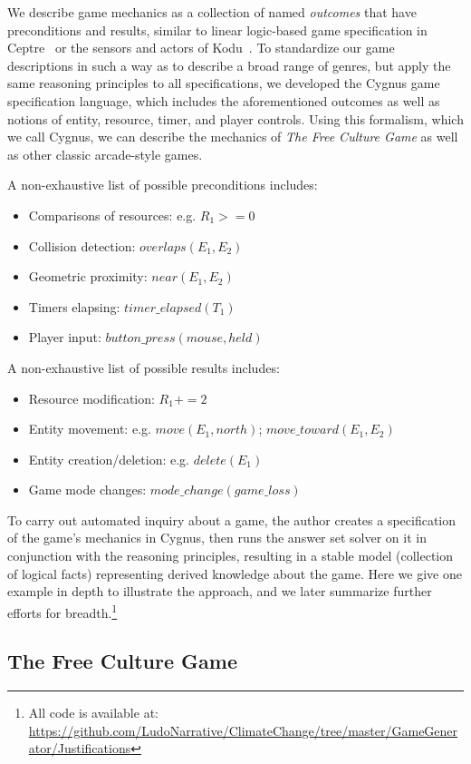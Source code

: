 \documentclass[a4paper]{article}
\begin{document}
We describe game mechanics as a collection of named {\em outcomes} that
have preconditions and results, similar to linear logic-based game
specification in Ceptre~\cite{martens2015ceptre} or the sensors and actors
of Kodu~\cite{stolee2011expressing}. To standardize our game descriptions
in such a way as to describe a broad range of genres, but apply the same
reasoning principles to all specifications, we developed the Cygnus game specification language, which includes the 
aforementioned outcomes as well as notions of
entity, resource, timer, and player controls. Using this formalism, which
we call Cygnus, we can describe the mechanics of {\em The Free Culture
Game} as well as other classic arcade-style games.

A non-exhaustive list of possible preconditions includes:
\begin{itemize}
\item Comparisons of resources: e.g. $R_1 >= 0$
\item Collision detection:  $overlaps(E_1, E_2)$
\item Geometric proximity: $near(E_1, E_2)$
\item Timers elapsing:    $timer\_elapsed(T_1)$
\item Player input:     $button\_press(mouse,held)$
\end{itemize}

A non-exhaustive list of possible results includes:
\begin{itemize}
\item Resource modification:  $R_1 += 2$
\item Entity movement:  e.g. $move(E_1,north)$; $move\_toward(E_1, E_2)$
\item Entity creation/deletion:  e.g. $delete(E_1)$
\item Game mode changes:  $mode\_change(game\_loss)$
\end{itemize}

To carry out automated inquiry about a game, the author creates a
specification of the game's mechanics in Cygnus, then runs the answer set
solver on it in conjunction with the reasoning principles, resulting in a
stable model (collection of logical facts) representing derived knowledge
about the game.  Here we give one example in depth to illustrate the
approach, and we later summarize further efforts for breadth.\footnote{All
code is available at:
\url{https://github.com/LudoNarrative/ClimateChange/tree/master/GameGenerator/Justifications}}

\subsection{The Free Culture Game}
\end{document}
